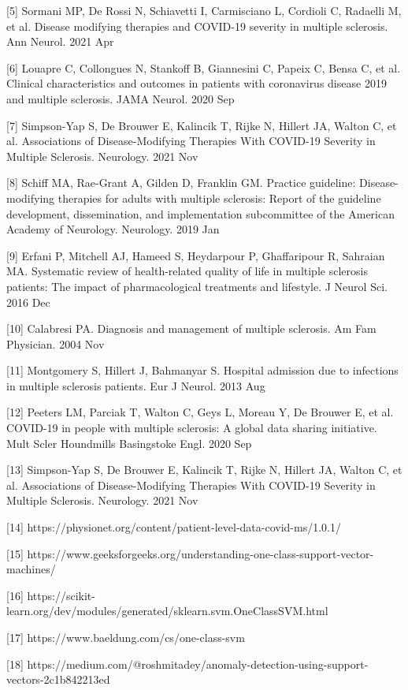 \documentclass[a4paper,fleqn]{cas-dc}
\begin{document}
[5] Sormani MP, De Rossi N, Schiavetti I, Carmisciano L, Cordioli C, Radaelli M, et al. Disease modifying therapies and COVID-19 severity in multiple sclerosis. Ann Neurol. 2021 Apr

[6] Louapre C, Collongues N, Stankoff B, Giannesini C, Papeix C, Bensa C, et al. Clinical characteristics and outcomes in patients with coronavirus disease 2019 and multiple sclerosis. JAMA Neurol. 2020 Sep

[7] Simpson-Yap S, De Brouwer E, Kalincik T, Rijke N, Hillert JA, Walton C, et al. Associations of Disease-Modifying Therapies With COVID-19 Severity in Multiple Sclerosis. Neurology. 2021 Nov

[8] Schiff MA, Rae-Grant A, Gilden D, Franklin GM. Practice guideline: Disease-modifying therapies for adults with multiple sclerosis: Report of the guideline development, dissemination, and implementation subcommittee of the American Academy of Neurology. Neurology. 2019 Jan

[9] Erfani P, Mitchell AJ, Hameed S, Heydarpour P, Ghaffaripour R, Sahraian MA. Systematic review of health-related quality of life in multiple sclerosis patients: The impact of pharmacological treatments and lifestyle. J Neurol Sci. 2016 Dec

[10] Calabresi PA. Diagnosis and management of multiple sclerosis. Am Fam Physician. 2004 Nov

[11] Montgomery S, Hillert J, Bahmanyar S. Hospital admission due to infections in multiple sclerosis patients. Eur J Neurol. 2013 Aug

[12] Peeters LM, Parciak T, Walton C, Geys L, Moreau Y, De Brouwer E, et al. COVID-19 in people with multiple sclerosis: A global data sharing initiative. Mult Scler Houndmills Basingstoke Engl. 2020 Sep

[13] Simpson-Yap S, De Brouwer E, Kalincik T, Rijke N, Hillert JA, Walton C, et al. Associations of Disease-Modifying Therapies With COVID-19 Severity in Multiple Sclerosis. 
Neurology. 2021 Nov

[14] https://physionet.org/content/patient-level-data-covid-ms/1.0.1/

[15] https://www.geeksforgeeks.org/understanding-one-class-support-vector-machines/

[16] https://scikit-learn.org/dev/modules/generated/sklearn.svm.OneClassSVM.html

[17] https://www.baeldung.com/cs/one-class-svm

[18] https://medium.com/@roshmitadey/anomaly-detection-using-support-vectors-2c1b842213ed
\end{document}
